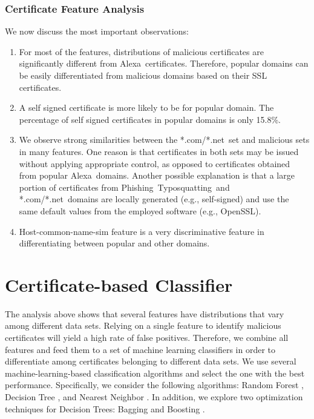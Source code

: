 \documentclass[twocolumn]{article}
\newcommand{\Alexa}{\textsf{Alexa}}
\newcommand{\phishing}{\textsf{Phishing}}
\newcommand{\typosquatting}{\textsf{Typosquatting}}
\newcommand{\comnet}{\textsf{*.com/*.net}}
\begin{document}
\subsubsection{Certificate Feature Analysis}
We now discuss the most important observations:
\begin{enumerate}
\item For most of the features, distributions of malicious certificates are significantly different from \Alexa\ certificates. 
Therefore, popular domains can be easily differentiated from malicious domains based on their SSL certificates. 


\item A self signed certificate is more likely to be for popular domain. The percentage of self signed certificates in popular domains is only 15.8\%.

\item We observe strong similarities between the \comnet\ set and malicious sets in many features. One reason is that certificates in both sets 
may be issued without applying appropriate control, as opposed to certificates obtained from popular \Alexa\ domains. Another possible 
explanation is that a large portion of  certificates from \phishing\, \typosquatting\ and \comnet\ domains are locally generated 
(e.g., self-signed) and use the same default values
from the employed software (e.g., OpenSSL).

\item Host-common-name-sim feature is a very discriminative feature in differentiating between popular and other domains. 
  
\end{enumerate}

\section{Certificate-based Classifier}\label{sec:classifier}
The analysis above shows that several features have  
distributions that vary among different data sets. Relying on a single feature to identify malicious certificates will yield a high rate of false positives. 
Therefore, we combine all features and feed them to a set of machine learning classifiers in order to differentiate among certificates belonging to different data sets. We use several machine-learning-based classification algorithms and select the one with the best performance.
Specifically, we consider the following algorithms: Random Forest \cite{randforest}, Decision Tree \cite{dtree}, and  Nearest Neighbor \cite{mlearn1}. In addition, we explore two optimization techniques for
Decision Trees: Bagging \cite{bagging, boost-bag-c4.5} and Boosting \cite{boosting, boost-bag-c4.5}.
\end{document}
